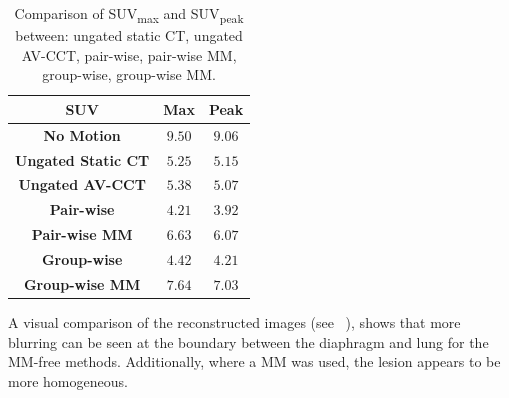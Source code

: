             \begin{table}
                \centering
                
                \captionsetup{singlelinecheck=false, justification=centering}
                \caption{Comparison of \gls{SUV}\textsubscript{max} and \gls{SUV}\textsubscript{peak} between: ungated static \gls{CT}, ungated \gls{AV-CCT}, pair-wise, pair-wise \gls{MM}, group-wise, group-wise \gls{MM}.}
                
                \resizebox*{1.0\linewidth}{!}
                {
                    \begin{tabular}{||c|cc||}
                        \hline
                        \textbf{\gls{SUV}}                  & \textbf{Max}  & \textbf{Peak} \\
                        \hline
                        \textbf{No Motion}                  & $9.50$        & $9.06$ \\
                        \hline
                        \textbf{Ungated Static \gls{CT}}    & $5.25$        & $5.15$ \\
                        \textbf{Ungated \gls{AV-CCT}}       & $5.38$        & $5.07$ \\
                        \hline
                        \textbf{Pair-wise}                  & $4.21$        & $3.92$ \\
                        \textbf{Pair-wise \gls{MM}}         & $6.63$        & $6.07$ \\
                        \hline
                        \textbf{Group-wise}                 & $4.42$        & $4.21$ \\
                        \textbf{Group-wise \gls{MM}}        & $7.64$        & $7.03$ \\
                        \hline
                    \end{tabular}
                }
                \label{tab:comparison_of_motion_correction_methods_incorporating_motion_modelling_for_pet/ct_using_a_single_breath_hold_attenuation_map_suv}
            \end{table}
            
            A visual comparison of the reconstructed images (see ~), shows that more blurring can be seen at the boundary between the diaphragm and lung for the \gls{MM}-free methods. Additionally, where a \gls{MM} was used, the lesion appears to be more homogeneous.
             
